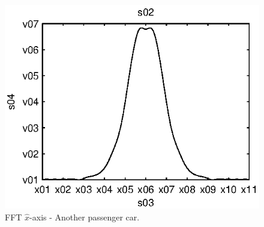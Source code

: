 \begin{subfigures}
\begin{figure}[thb]
\begin{minipage}{0.45\linewidth}
	\includegraphics[width=1\linewidth]{images/fft-car3-x}
  	\caption[FFT $\hat{x}$-axis - Another passenger car]{FFT $\hat{x}$-axis - Another passenger car.}
  	\label{fig:fft-car3-x}
 \end{minipage}


\end{figure}
\end{subfigures}
